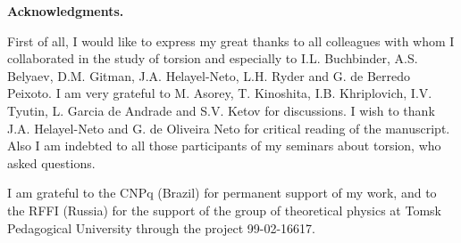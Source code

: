 \vskip 6mm\vskip 6mm\vskip 6mm

\noindent
{\bf Acknowledgments.}
\vskip 3mm

First of all, I would like to express my great thanks to all 
colleagues with whom I collaborated in the study of torsion
and especially to I.L. Buchbinder, A.S. Belyaev, D.M. Gitman, 
J.A. Helayel-Neto, L.H. Ryder and G. de Berredo Peixoto. 
I am very grateful to  M. Asorey, T. Kinoshita, 
I.B. Khriplovich, I.V. Tyutin, L. Garcia de Andrade and 
S.V. Ketov for discussions.
I wish to thank J.A. Helayel-Neto and G. de Oliveira Neto 
for critical reading of the manuscript. 
Also I am indebted to all those
participants of my seminars about torsion, who asked 
questions.

I am grateful to the CNPq (Brazil) for permanent support
of my work,
and to the RFFI (Russia) for the support of the group 
of theoretical physics at Tomsk Pedagogical University
through the project 99-02-16617.


\vskip 6mm
\newpage

